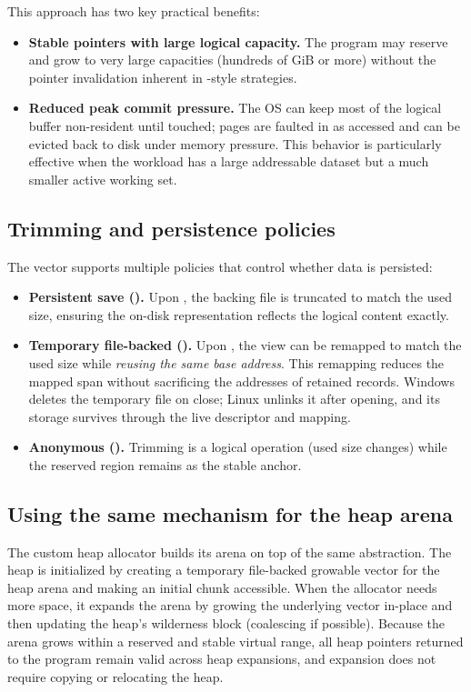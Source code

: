This approach has two key practical benefits:
\begin{itemize}
  \item \textbf{Stable pointers with large logical capacity.} The program may
  reserve and grow to very large capacities (hundreds of GiB or more) without
  the pointer invalidation inherent in -style strategies.
  \item \textbf{Reduced peak commit pressure.} The OS can keep most of the
  logical buffer non-resident until touched; pages are faulted in as accessed
  and can be evicted back to disk under memory pressure. This behavior is particularly
  effective when the workload has a large addressable dataset but a much smaller
  active working set.
\end{itemize}

\subsection{Trimming and persistence policies}
\label{sec:trim_persist}

The vector supports multiple policies that control whether data is persisted:
\begin{itemize}
  \item \textbf{Persistent save ().} Upon ,
  the backing file is truncated to match the used size, ensuring the on-disk
  representation reflects the logical content exactly.
  \item \textbf{Temporary file-backed ().} Upon
  , the view can be remapped to match the used size while
  \emph{reusing the same base address}. This remapping reduces the mapped span without
  sacrificing the addresses of retained records. Windows deletes the temporary
  file on close; Linux unlinks it after opening, and its storage survives through
  the live descriptor and mapping.
  \item \textbf{Anonymous ().} Trimming is a logical operation
  (used size changes) while the reserved region remains as the stable anchor.
\end{itemize}

\subsection{Using the same mechanism for the heap arena}
\label{sec:heap_uses_growable_vector}

The custom heap allocator builds its arena on top of the same
 abstraction. The heap is initialized by
creating a temporary file-backed growable vector for the heap arena and making
an initial chunk accessible. When the allocator needs more space, it expands the
arena by growing the underlying vector in-place and then updating the heap's
wilderness block (coalescing if possible). Because the arena grows within a
reserved and stable virtual range, all heap pointers returned to the program
remain valid across heap expansions, and expansion does not require copying or
relocating the heap.

